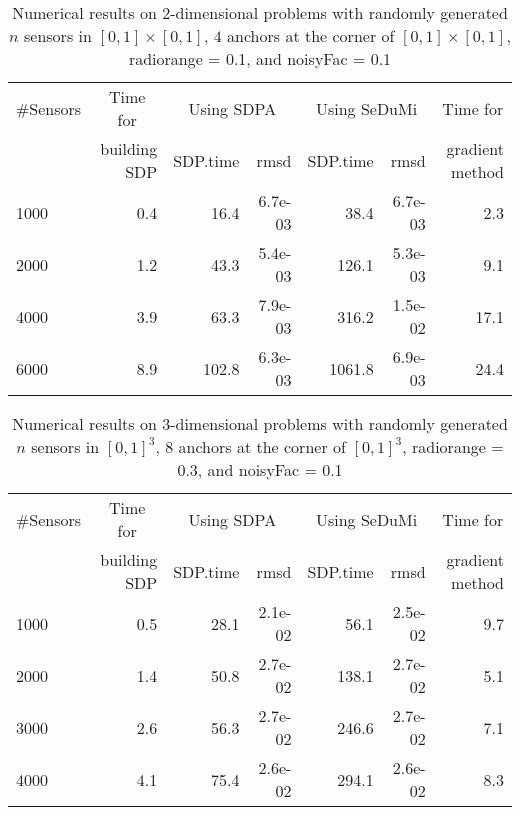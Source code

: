 \documentclass[12pt]{article}
\begin{document}
\begin{table}[h!]
\begin{center}
\begin{tabular}{|l|r|rr|rr|r|}
\hline 
\#Sensors        &  \multicolumn{1}{|c|}{Time for }   &  \multicolumn{2}{|c|}{Using SDPA}  & \multicolumn{2}{|c|}{Using SeDuMi}
 & \multicolumn{1}{|c|}{Time for } \\ 
\cline{3-6}
                      & building SDP     & SDP.time & rmsd         & SDP.time & rmsd & gradient method\\ 
\hline                 
1000 &    0.4 &   16.4 & 6.7e-03 &   38.4 & 6.7e-03 &    2.3 \\
2000 &    1.2 &   43.3 & 5.4e-03 &  126.1 & 5.3e-03 &    9.1 \\
4000 &    3.9 &   63.3 & 7.9e-03 &  316.2 & 1.5e-02 &   17.1 \\
6000 &    8.9 &  102.8 & 6.3e-03 & 1061.8 & 6.9e-03 &   24.4 \\
\hline
\end{tabular}
\label{TABLE2D}
\end{center}
\caption{Numerical results on $2$-dimensional problems with randomly generated $n$ sensors
in $[0,1] \times [0,1]$, $4$ anchors at the corner of  $[0,1] \times [0,1]$, radiorange = 0.1,  and noisyFac = 0.1}
\end{table}

\begin{table}[h!]
\begin{center}
\begin{tabular}{|l|r|rr|rr|r|}
\hline 
\#Sensors        &  \multicolumn{1}{|c|}{Time for}   &  \multicolumn{2}{|c|}{Using SDPA}  & \multicolumn{2}{|c|}{Using SeDuMi}
 & \multicolumn{1}{|c|}{Time for } \\ 
\cline{3-6}
                      & building SDP     & SDP.time & rmsd         & SDP.time & rmsd & gradient method\\ 
\hline                 
1000 &    0.5 &   28.1 & 2.1e-02 &   56.1 & 2.5e-02 &    9.7 \\
2000 &    1.4 &   50.8 & 2.7e-02 &  138.1 & 2.7e-02 &    5.1 \\
3000 &    2.6 &   56.3 & 2.7e-02 &  246.6 & 2.7e-02 &    7.1 \\
4000 &    4.1 &   75.4 & 2.6e-02 &  294.1 & 2.6e-02 &    8.3 \\
\hline
\end{tabular}
\end{center}
\caption{Numerical results on $3$-dimensional problems with randomly generated $n$ sensors
in $[0,1]^3$, $8$ anchors at the corner of  $[0,1]^3$, radiorange = 0.3,  and noisyFac = 0.1}
\label{TABLE3D} 
\end{table}
\end{document}
